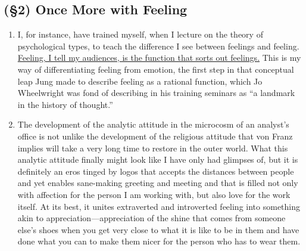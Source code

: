\subsection{(\S2) Once More with Feeling}

\begin{enumerate}

    \item {} I, for instance, have trained myself,
        when I lecture on the theory of psychological types, to teach the
        difference I see between feelings and feeling. \ul{Feeling, I tell my
        audiences, is the function that sorts out feelings.} This is my way of
        differentiating feeling from emotion, the first step in that conceptual
        leap Jung made to describe feeling as a rational function, which Jo
        Wheelwright was fond of describing in his training seminars as “a
        landmark in the history of thought.”

    \item {} The development of the analytic attitude
        in the microcosm of an analyst's office is not unlike the development
        of the religious attitude that von Franz implies will take a very long
        time to restore in the outer world. What this analytic attitude finally
        might look like I have only had glimpses of, but it is definitely an
        eros tinged by logos that accepts the distances between people and yet
        enables sane-making greeting and meeting and that is filled not only
        with affection for the person I am working with, but also love for the
        work itself. At its best, it unites extraverted and introverted feeling
        into something akin to appreciation—appreciation of the shine that
        comes from someone else's shoes when you get very close to what it is
        like to be in them and have done what you can to make them nicer for
        the person who has to wear them.

\end{enumerate}

